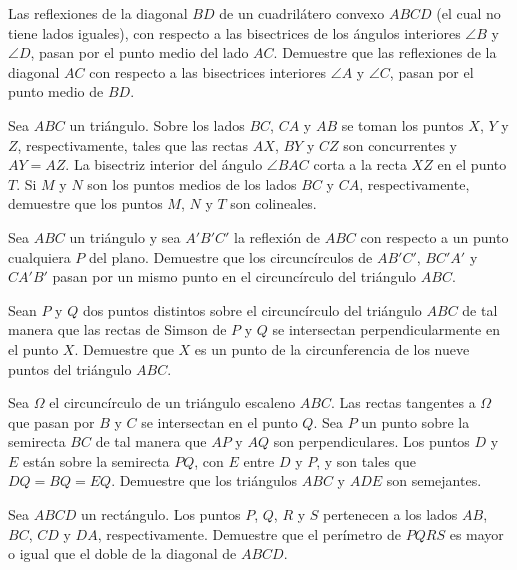 
\begin{probEG}
	Las reflexiones de la diagonal $BD$ de un cuadrilátero convexo $ABCD$ (el cual no tiene lados iguales), con respecto a las bisectrices de los ángulos interiores $\angle B$ y $\angle D$, pasan por el punto medio del lado $AC$. Demuestre que las reflexiones de la diagonal $AC$ con respecto a las bisectrices interiores $\angle A$ y $\angle C$, pasan por el punto medio de $BD$.
\end{probEG}

\begin{probEG}
	Sea $ABC$ un triángulo. Sobre los lados $BC$, $CA$ y $AB$ se toman los puntos $X$, $Y$ y $Z$, respectivamente, tales que las rectas $AX$, $BY$ y $CZ$ son concurrentes y $AY=AZ$. La bisectriz interior del ángulo $\angle BAC$ corta a la recta $XZ$ en el punto $T$. Si $M$ y $N$ son los puntos medios de los lados $BC$ y $CA$, respectivamente, demuestre que los puntos $M$, $N$ y $T$ son colineales.
\end{probEG}

\begin{probEG}
	Sea $ABC$ un triángulo y sea $A'B'C'$ la reflexión de $ABC$ con respecto a un punto cualquiera $P$ del plano. Demuestre que los circuncírculos de $AB'C'$, $BC'A'$ y $CA'B'$ pasan por un mismo punto en el circuncírculo del triángulo $ABC$.
\end{probEG}

\begin{probEG}
	Sean $P$ y $Q$ dos puntos distintos sobre el circuncírculo del triángulo $ABC$ de tal manera que las rectas de Simson de $P$ y $Q$ se intersectan perpendicularmente en el punto $X$. Demuestre que $X$ es un punto de la circunferencia de los nueve puntos del triángulo $ABC$.
\end{probEG}

\begin{probEG}
	Sea $\Omega$ el circuncírculo de un triángulo escaleno $ABC$. Las rectas tangentes a $\Omega$ que pasan por $B$ y $C$ se intersectan en el punto $Q$. Sea $P$ un punto sobre la semirecta $BC$ de tal manera que $AP$ y $AQ$ son perpendiculares. Los puntos $D$ y $E$ están sobre la semirecta $PQ$, con $E$ entre $D$ y $P$, y son tales que $DQ=BQ=EQ$. Demuestre que los triángulos $ABC$ y $ADE$ son semejantes.
\end{probEG}

\begin{probEG}
	Sea $ABCD$ un rectángulo. Los puntos $P$, $Q$, $R$ y $S$ pertenecen a los lados $AB$, $BC$, $CD$ y $DA$, respectivamente. Demuestre que el perímetro de $PQRS$ es mayor o igual que el doble de la diagonal de $ABCD$.
\end{probEG}

